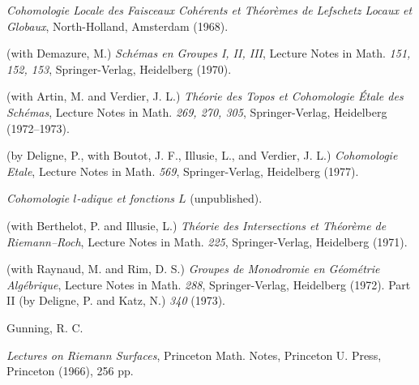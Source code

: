 {\noindent\hangindent=52bp\hspace*{10bp}%
\emph{Cohomologie Locale des Faisceaux Coh\'erents et Th\'eor\`emes de Lefschetz Locaux et Globaux}, North-Holland, Amsterdam (1968).\par
\noindent\hangindent=52bp\hspace*{10bp}%
(with Demazure, M.) \emph{Sch\'emas en Groupes I, II, III}, Lecture Notes in Math. \emph{151, 152, 153}, Springer-Verlag, Heidelberg (1970).\par
\noindent\hangindent=52bp\hspace*{10bp}%
(with Artin, M. and Verdier, J. L.) \emph{Th\'eorie des Topos et Cohomologie \'Etale des Sch\'emas}, Lecture Notes in Math. \emph{269, 270, 305}, Springer-Verlag, Heidelberg (1972--1973).\par
\noindent\hangindent=52bp\hspace*{10bp}%
(by Deligne, P., with Boutot, J. F., Illusie, L., and Verdier, J. L.) \emph{Cohomologie Etale}, Lecture Notes in Math. \emph{569}, Springer-Verlag, Heidelberg (1977).\par
\noindent\hangindent=52bp\hspace*{10bp}%
\emph{Cohomologie $l$-adique et fonctions $L$} (unpublished).\par
\noindent\hangindent=52bp\hspace*{10bp}%
(with Berthelot, P. and Illusie, L.) \emph{Th\'eorie des Intersections et Th\'eor\`eme de Riemann--Roch}, Lecture Notes in Math. \emph{225}, Springer-Verlag, Heidelberg (1971).\par
\noindent\hangindent=52bp\hspace*{10bp}%
(with Raynaud, M. and Rim, D. S.) \emph{Groupes de Monodromie en G\'eom\'etrie Alg\'ebrique}, Lecture Notes in Math. \emph{288}, Springer-Verlag, Heidelberg (1972). Part II (by Deligne, P. and Katz, N.) \emph{340} (1973).\par
\par\vspace{2.15pt}\noindent \hypertarget{bib-476-19}{}Gunning, R. C.\par
\noindent\hangindent=25bp\hspace*{6bp}%
\emph{Lectures on Riemann Surfaces}, Princeton Math. Notes, Princeton U. Press, Princeton (1966), 256 pp.\par
}
